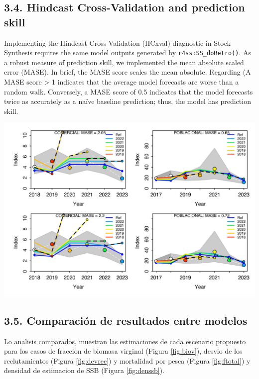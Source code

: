 \documentclass[
]{article}
\begin{document}
\hypertarget{hindcast-cross-validation-and-prediction-skill}{%
\subsection{3.4. Hindcast Cross-Validation and prediction skill}\label{hindcast-cross-validation-and-prediction-skill}}

Implementing the Hindcast Cross-Validation (HCxval) diagnostic in Stock Synthesis requires the same model outputs generated by \texttt{r4ss:SS\_doRetro()}. As a robust measure of prediction skill, we implemented the mean absolute scaled error (MASE). In brief, the MASE score scales the mean absolute. Regarding (A MASE score \textgreater{} 1 indicates that the average model forecasts are worse than a random walk. Conversely, a MASE score of 0.5 indicates that the model forecasts twice as
accurately as a naïve baseline prediction; thus, the model has prediction skill.

\begin{center}\includegraphics{Dtrunculus_SS3_2024_files/figure-latex/unnamed-chunk-16-1} \end{center}

\pagebreak

\hypertarget{comparaciuxf3n-de-resultados-entre-modelos}{%
\subsection{3.5. Comparación de resultados entre modelos}\label{comparaciuxf3n-de-resultados-entre-modelos}}

Lo analisis comparados, muestran las estimaciones de cada escenario propuesto para los casos de fraccion de biomasa virginal (Figura \ref{fig:biov}), desvio de los reclutamientos (Figura \ref{fig:devrec}) y mortalidad por pesca (Figura \ref{fig:ftotal}) y densidad de estimacion de SSB (Figura \ref{fig:denssb}).
\end{document}
